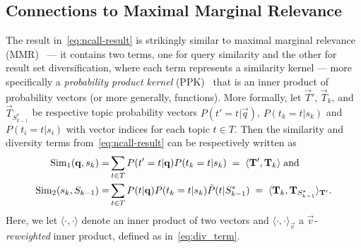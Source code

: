 
\subsection{Connections to Maximal Marginal Relevance}

\label{subsec:mmr_comp}

The result in~\eqref{eq:ncall-result} is strikingly similar to maximal marginal
relevance (MMR)~\cite{carbonell98MMR} --- it
contains two terms, one for query similarity and the other for result
set diversification, where each term represents a similarity kernel
--- more specifically a \emph{probability product kernel}
(PPK)~\cite{prodprobkernel} that is an inner product of probability
vectors (or more generally, functions).  More formally, let
$\vec{T}'$, $\vec{T}_k$, and $\vec{T}_{S_{k-1}^*}$ be respective topic
probability vectors $P(t'=t|\vec{q})$, $P(t_k=t|s_k)$ and
$P(t_i\!=\!t|s_i)$
with vector indices for each topic $t
\in T$.  Then the similarity and diversity terms from~\eqref{eq:ncall-result}
can be respectively written as
\begin{align}
\Sim_1(\vec{q},s_k) = & 
\sum_{t \in T} P(t'=t|\vec{q}) P(t_k=t|s_{k}) \; = \; \langle \vec{T}',\vec{T}_k \rangle \label{eq:sim_term} \; \mbox{and}\\
\Sim_2(s_k,S_{k-1}) = & 
\sum_{t \in T} P(t|\vec{q}) P(t_k=t|s_k) \tilde{P}(t | S_{k-1}^*) \; = \; \langle \vec{T}_k, \vec{T}_{S_{k-1}^*} \rangle_{\vec{T}'}. \label{eq:div_term}
\end{align}
Here, we let $\langle \cdot,\cdot \rangle$ denote an inner product of
two vectors and $\langle \cdot,\cdot \rangle_\vec{v}$ a
\emph{$\vec{v}$-reweighted} inner product, defined as
in~\eqref{eq:div_term}.

